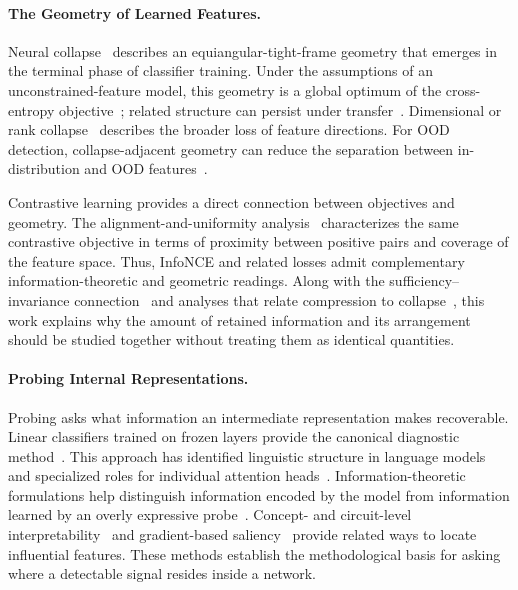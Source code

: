 \paragraph{The Geometry of Learned Features.}
Neural collapse~\citep{Papyan2020nc} describes an equiangular-tight-frame geometry
that emerges in the terminal phase of classifier training. Under the assumptions
of an unconstrained-feature model, this geometry is a global optimum of the
cross-entropy objective~\citep{Zhu2021nc}; related structure can persist under
transfer~\citep{Galanti2022collapse}. Dimensional or rank
collapse~\citep{Jing2022rank} describes the broader loss of feature directions.
For OOD detection, collapse-adjacent geometry can reduce the separation between
in-distribution and OOD features~\citep{Haas2022ncood}.

Contrastive learning provides a direct connection between objectives and geometry.
The alignment-and-uniformity analysis~\citep{wang2021understanding} characterizes
the same contrastive objective in terms of proximity between positive pairs and
coverage of the feature space. Thus, InfoNCE and related losses admit complementary
information-theoretic and geometric readings. Along with the
sufficiency--invariance connection~\citep{achille2018emergence} and analyses that
relate compression to collapse~\citep{shwartz2023compress}, this work explains why
the amount of retained information and its arrangement should be studied together
without treating them as identical quantities.

\paragraph{Probing Internal Representations.}
Probing asks what information an intermediate representation makes recoverable.
Linear classifiers trained on frozen layers provide the canonical diagnostic
method~\citep{alain2017understanding,belinkov2019analysis}. This approach has
identified linguistic structure in language models
\citep{tenney2019bert,hewitt2019structural} and specialized roles for individual
attention heads~\citep{voita2019analyzing}. Information-theoretic formulations
help distinguish information encoded by the model from information learned by an
overly expressive probe~\citep{voita2019information}. Concept- and circuit-level
interpretability~\citep{kim2018interpretability,olah2020zoom} and gradient-based
saliency~\citep{selvaraju2017grad} provide related ways to locate influential
features. These methods establish the methodological basis for asking where a
detectable signal resides inside a network.

